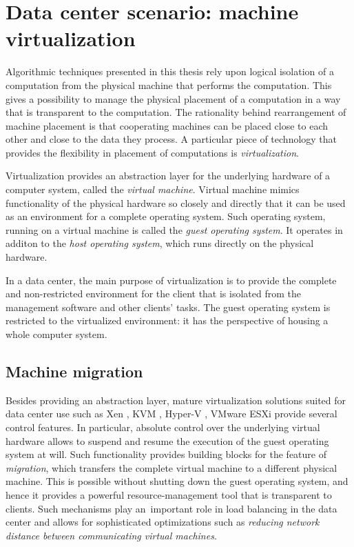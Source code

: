 \section{Data center scenario: machine virtualization}
\label{sec:intro-machine-virtualization}

Algorithmic techniques presented in this thesis rely upon logical isolation of a computation from the physical machine that performs the computation.
This gives a possibility to manage the physical placement of a computation in a way that is transparent to the computation.
The rationality behind rearrangement of machine placement is that cooperating machines can be placed close to each other and close to the data they process.
A particular piece of technology that provides the flexibility in placement of computations is \emph{virtualization}.

Virtualization provides an abstraction layer for the underlying hardware of a computer system, called the \emph{virtual machine}.
Virtual machine mimics functionality of the physical hardware so closely and
directly that it can be used as an environment for a complete operating system.
Such operating system, running on a virtual machine is called the \emph{guest
operating system}. It operates in additon to the \emph{host operating
system}, which runs directly on the physical hardware. 

In a data center, the main purpose of virtualization is to provide the complete and non-restricted environment for the client that is isolated from the management software and other clients' tasks.
The guest operating system is restricted to the virtualized environment: it has the perspective of housing a whole computer system.


\subsection{Machine migration}

Besides providing an abstraction layer, mature virtualization solutions suited for data center use such as Xen
\cite{url-xen}, KVM \cite{url-kvm}, Hyper-V \cite{url-hyperv}, VMware ESXi
\cite{url-vmware} provide several control features.
In particular, absolute control over the underlying virtual hardware allows to suspend and resume the execution of the guest operating system at will.
Such functionality provides building blocks for the feature of \emph{migration}, which transfers the complete virtual machine to a different physical machine.
This is possible without shutting down the guest operating system, and hence it provides a powerful resource-management tool that is transparent to clients.
Such mechanisms play an~important role in load balancing in the data center and allows for sophisticated optimizations such as \emph{reducing network distance between communicating virtual machines}.

